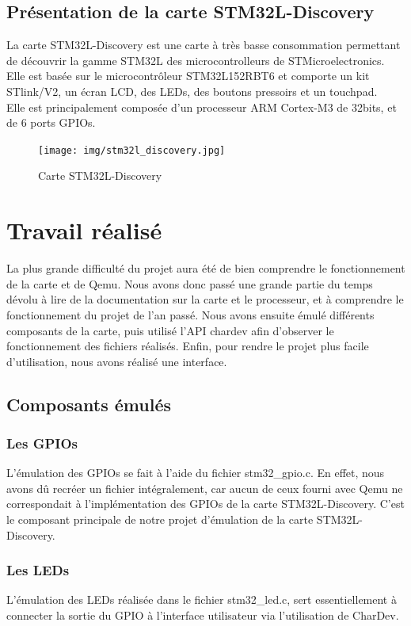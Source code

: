 \documentclass{article}
\begin{document}
	 \subsection{Présentation de la carte STM32L-Discovery}
		La carte STM32L-Discovery est une carte à très basse consommation permettant de découvrir la gamme STM32L 
		des microcontrolleurs de STMicroelectronics. Elle est basée sur le microcontrôleur STM32L152RBT6 et comporte un kit STlink/V2,
		un écran LCD, des LEDs, des boutons pressoirs et un touchpad.\\
		Elle est principalement composée d'un processeur ARM Cortex-M3 de 32bits, et de 6 ports GPIOs.\\
		\begin{figure}[h]
		  \centering
		  \texttt{[image: img/stm32l\_discovery.jpg]}
		  \caption{Carte STM32L-Discovery}
		\end{figure}

		
\section{Travail réalisé}
	La plus grande difficulté du projet aura été de bien comprendre le fonctionnement de la carte et de Qemu. Nous avons donc passé 
	une grande partie du temps dévolu à lire de la documentation sur la carte et le processeur, et à comprendre le fonctionnement du projet de l'an 
	passé.
	Nous avons ensuite émulé différents composants de la carte, puis utilisé l'API chardev afin d'observer le fonctionnement des fichiers
	réalisés. Enfin, pour rendre le projet plus facile d'utilisation, nous avons réalisé une interface.
	
	\subsection{Composants émulés}
		\subsubsection{Les GPIOs}
			L'émulation des GPIOs se fait à l'aide du fichier stm32\_gpio.c. En effet, nous avons dû recréer un fichier intégralement,
			car aucun de ceux fourni avec Qemu ne correspondait à l'implémentation des GPIOs de la carte STM32L-Discovery.
			C'est le composant principale de notre projet d'émulation de la carte STM32L-Discovery. 
		\subsubsection{Les LEDs}
			L'émulation des LEDs réalisée dans le fichier stm32\_led.c, sert essentiellement à connecter la sortie du GPIO à l'interface utilisateur
			via l'utilisation de CharDev.
\end{document}
